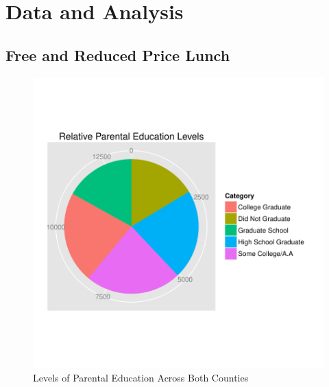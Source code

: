 \documentclass[twocolumn,english]{IEEEtran}
\theoremstyle{plain}
\theoremstyle{plain}
\begin{document}
\section{Data and Analysis}

\subsection{Free and Reduced Price Lunch}
\begin{figure}[H]
		\begin{centering}
\includegraphics{proj3-pie_1}
		\caption{Levels of Parental Education Across Both Counties}
		\label{fig:pie_education}
		\end{centering}
\end{figure}
\end{document}
